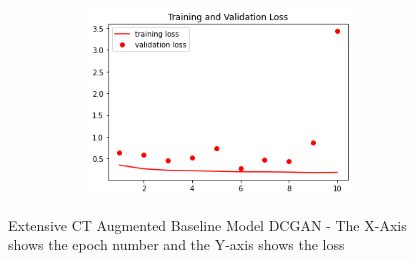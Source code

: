  \begin{figure}[H]
    \centering
    \includegraphics[width=1\textwidth,height=5cm,keepaspectratio]{Images/ExtensiveCNNBaselineModelExtensiveCovidLossCTAugmentedDCGAN.png}\\
    \caption{Extensive CT Augmented Baseline Model DCGAN - The X-Axis shows the epoch number and the Y-axis shows the loss}
    \label{fig:Extensive CT Augmented Baseline Model DCGAN Loss}
\end{figure}
